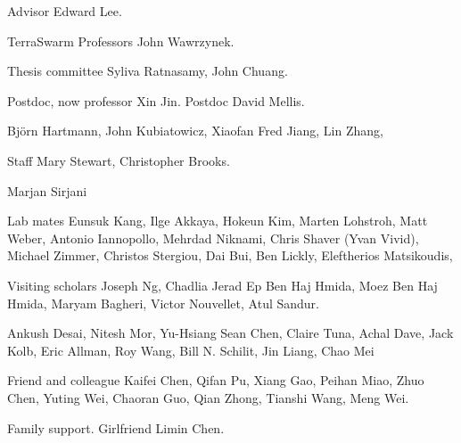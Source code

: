 \begin{acknowledgements}

  Advisor Edward Lee.

  TerraSwarm Professors John Wawrzynek.

  Thesis committee Syliva Ratnasamy, John Chuang.

  Postdoc, now professor Xin Jin. Postdoc David Mellis.

  Bj\"orn Hartmann, John Kubiatowicz, Xiaofan Fred Jiang, Lin Zhang,

  Staff Mary Stewart, Christopher Brooks.

  Marjan Sirjani

  Lab mates Eunsuk Kang, Ilge Akkaya, Hokeun Kim, Marten Lohstroh, Matt Weber,
  Antonio Iannopollo, Mehrdad Niknami, Chris Shaver (Yvan Vivid), Michael
  Zimmer, Christos Stergiou, Dai Bui, Ben Lickly, Eleftherios Matsikoudis,

  Visiting scholars Joseph Ng, Chadlia Jerad Ep Ben Haj Hmida, Moez Ben Haj
  Hmida, Maryam Bagheri, Victor Nouvellet, Atul Sandur.


  Ankush Desai, Nitesh Mor, Yu-Hsiang Sean Chen, Claire Tuna, Achal Dave, Jack
  Kolb, Eric Allman, Roy Wang, Bill N. Schilit, Jin Liang, Chao Mei

  Friend and colleague Kaifei Chen, Qifan Pu, Xiang Gao, Peihan Miao, Zhuo Chen,
  Yuting Wei, Chaoran Guo, Qian Zhong, Tianshi Wang, Meng Wei.

  Family support. Girlfriend Limin Chen.

\end{acknowledgements}

